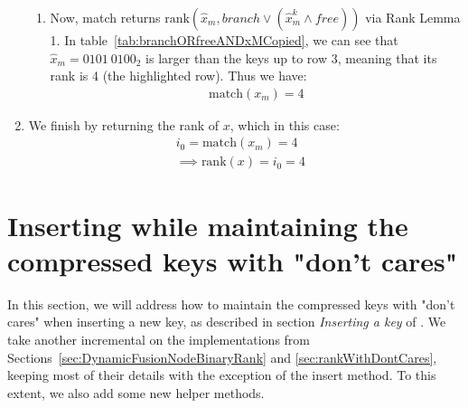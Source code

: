 \begin{enumerate}
\begin{enumerate}
        \item
        Now, match returns $\text{rank}(\hat x_m, branch \vee (\hat x^k_m \wedge free))$ via Rank Lemma 1. In table~\ref{tab:branchORfreeANDxMCopied}, we can see that $\hat x_m = 0101\ 0100_2$ is larger than the keys up to row 3, meaning that its rank is 4 (the highlighted row). Thus we have:
        \begin{align*}
            \text{match}(x_m) = 4
        \end{align*}
    \end{enumerate}
    
    \item
    We finish by returning the rank of $x$, which in this case:
    \begin{align*}
        i_0 = \text{match}(x_m) = 4& \\
        \implies \text{rank}(x) = i_0 = 4&
    \end{align*}
\end{enumerate}

\newpage
\section{Inserting while maintaining the compressed keys with "don't cares"} \label{sec:InsertDontCares}

In this section, we will address how to maintain the compressed keys with "don't cares" when inserting a new key, as described in section \textit{Inserting a key} of \cite{patrascu2014dynamic}. We take another incremental on the implementations from Sections~\ref{sec:DynamicFusionNodeBinaryRank} and \ref{sec:rankWithDontCares}, keeping most of their details with the exception of the {\ttfamily insert} method. To this extent, we also add some new helper methods.

